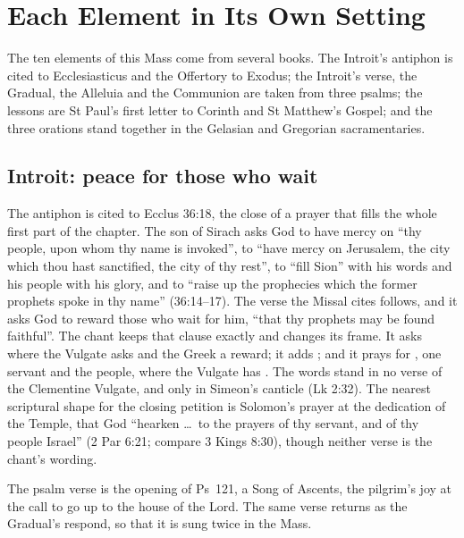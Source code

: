 \section{Each Element in Its Own Setting}
\label{sec:each-element}

The ten elements of this Mass come from several books. The Introit's antiphon
is cited to Ecclesiasticus and the Offertory to Exodus; the Introit's verse,
the Gradual, the Alleluia and the Communion are taken from three psalms; the
lessons are St Paul's first letter to Corinth and St Matthew's Gospel; and the
three orations stand together in the Gelasian and Gregorian sacramentaries.

\subsection{Introit: peace for those who wait}

The antiphon is cited to Ecclus 36:18, the close of a prayer that fills the
whole first part of the chapter. The son of Sirach asks God to have mercy on
``thy people, upon whom thy name is invoked'', to ``have mercy on Jerusalem,
the city which thou hast sanctified, the city of thy rest'', to ``fill Sion''
with his words and his people with his glory, and to ``raise up the
prophecies which the former prophets spoke in thy name'' (36:14--17). The
verse the Missal cites follows, and it asks God to reward those who wait for
him, ``that thy prophets may be found faithful''. The chant keeps that clause
exactly and changes its frame. It asks  where the Vulgate asks
 and the Greek a reward; it adds ; and it prays
for , one servant and the people, where
the Vulgate has . The words  stand in no
verse of the Clementine Vulgate, and  only in
Simeon's canticle (Lk 2:32). The nearest scriptural shape for the closing
petition is Solomon's prayer at the dedication of the Temple, that God
``hearken \dots\ to the prayers of thy servant, and of thy people Israel'' (2 Par
6:21; compare 3 Kings 8:30), though neither verse is the chant's wording.

The psalm verse is the opening of Ps~121, a Song of Ascents, the pilgrim's
joy at the call to go up to the house of the Lord. The same verse returns as
the Gradual's respond, so that it is sung twice in the Mass.


